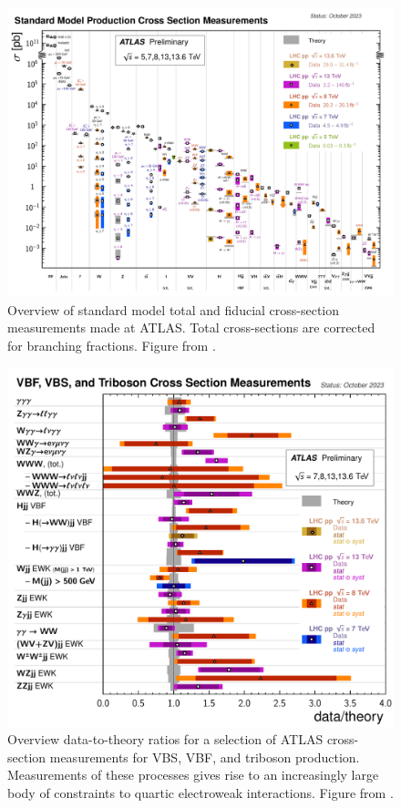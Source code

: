 \begin{figure}
    \centering
    \includegraphics[width=\textwidth]{plots/theory/SM_summary_xsections.pdf}
    \caption{Overview of standard model total and fiducial cross-section measurements made at ATLAS. Total cross-sections are corrected for branching fractions. Figure from \cite{Theory:AtlasSummary}.\label{fig:smxsections}}
\end{figure}

\begin{figure}
    \centering
    \includegraphics[width=\textwidth]{plots/theory/SM_VBS_Measurements.pdf}
    \caption{Overview data-to-theory ratios for a selection of ATLAS cross-section measurements for VBS, VBF, and triboson production. Measurements of these processes gives rise to an increasingly large body of constraints to quartic electroweak interactions. Figure from \cite{Theory:AtlasSummary}.\label{fig:smvbsmeasurements}}
\end{figure}

